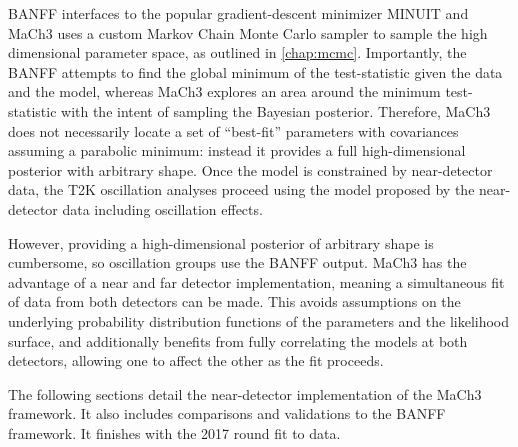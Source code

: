 BANFF interfaces to the popular gradient-descent minimizer MINUIT \cite{minuit} and MaCh3 uses a custom Markov Chain Monte Carlo sampler to sample the high dimensional parameter space, as outlined in \autoref{chap:mcmc}. Importantly, the BANFF attempts to find the global minimum of the test-statistic given the data and the model, whereas MaCh3 explores an area around the minimum test-statistic with the intent of sampling the Bayesian posterior. Therefore, MaCh3 does not necessarily locate a set of ``best-fit'' parameters with covariances assuming a parabolic minimum: instead it provides a full high-dimensional posterior with arbitrary shape. Once the model is constrained by near-detector data, the T2K oscillation analyses proceed using the model proposed by the near-detector data including oscillation effects.

However, providing a high-dimensional posterior of arbitrary shape is cumbersome, so oscillation groups use the BANFF output. MaCh3 has the advantage of a near and far detector implementation, meaning a simultaneous fit of data from both detectors can be made\cite{t2k_2015,thesis_elder, thesis_leila, thesis_kirsty, thesis_rich}. This avoids assumptions on the underlying probability distribution functions of the parameters and the likelihood surface, and additionally benefits from fully correlating the models at both detectors, allowing one to affect the other as the fit proceeds.

The following sections detail the near-detector implementation of the MaCh3 framework. It also includes comparisons and validations to the BANFF framework. It finishes with the 2017 round fit to data.
